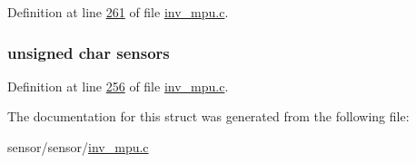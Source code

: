 Definition at line \hyperlink{inv__mpu_8c_source_l00261}{261} of file \hyperlink{inv__mpu_8c_source}{inv\+\_\+mpu.\+c}.

\subsubsection[{\texorpdfstring{sensors}{sensors}}]{\setlength{\rightskip}{0pt plus 5cm}unsigned char sensors}\hypertarget{structchip__cfg__s_aaa21c01566947e7007476657cb614e3f}{}\label{structchip__cfg__s_aaa21c01566947e7007476657cb614e3f}


Definition at line \hyperlink{inv__mpu_8c_source_l00256}{256} of file \hyperlink{inv__mpu_8c_source}{inv\+\_\+mpu.\+c}.



The documentation for this struct was generated from the following file\+:\begin{DoxyCompactItemize}
\item 
sensor/sensor/\hyperlink{inv__mpu_8c}{inv\+\_\+mpu.\+c}\end{DoxyCompactItemize}
